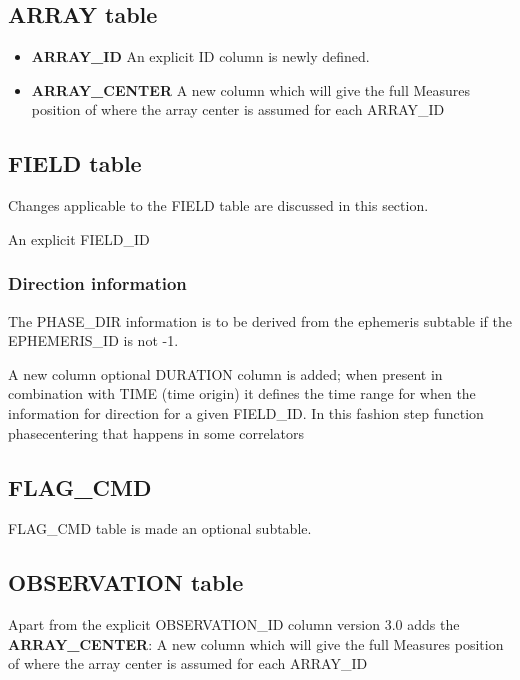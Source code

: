 \documentclass{article}
\begin{document}
\subsection{ARRAY table}


\begin{itemize}

\item {{\bf ARRAY\_ID} An explicit ID column is newly defined}.


\item{{\bf ARRAY\_CENTER} A new column which will give the full
    Measures position of where the array center is assumed for each
    ARRAY\_ID}

\end{itemize}

\subsection{FIELD table}

Changes applicable to the FIELD table are discussed in this section.

An explicit FIELD\_ID
\subsubsection{Direction information}

The PHASE\_DIR information is to be derived from the ephemeris subtable
if the EPHEMERIS\_ID is not -1. 

A new column optional DURATION column is added; when present in
combination with TIME (time origin) it defines the time range for when
the information for direction for a given FIELD\_ID. In this fashion
step function phasecentering that happens in some correlators


\subsection{FLAG\_CMD}

FLAG\_CMD table is made an optional subtable.


\subsection{OBSERVATION table}

Apart from the explicit OBSERVATION\_ID column version 3.0 adds the
{\bf ARRAY\_CENTER}: A new column which will give the full Measures
position of where the array center is assumed for each ARRAY\_ID
\end{document}
